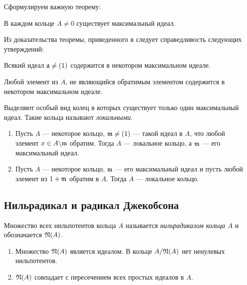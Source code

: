     Сформулируем важную теорему:
    \begin{Theorem}{\cite{A-M}}
        В каждом кольце $A \neq 0$ существует максимальный идеал.
    \end{Theorem}
    Из доказательства теоремы, приведенного в \cite{A-M} следует справедливость следующих утверждений:
    \begin{Corollary} {\cite{A-M}} 
        Всякий идеал $\mathfrak{a} \neq (1)$ содержится в некотором максимальном идеале.
    \end{Corollary}
    \begin{Corollary} \cite{A-M}
        Любой элемент из $A$, не являющийся обратимым элементом содержится в некотором максимальном идеале.
    \end{Corollary}

    Выделяют особый вид колец в которых существует только один максимальный идеал. Такие кольца называют \textit{локальными}.
    
    \begin{Theorem}{\cite{A-M}}
        \begin{enumerate}
            \item Пусть $A$ --- некоторое кольцо, $\mathfrak{m} \neq (1)$ --- такой идеал в $A$, что любой элемент $x \in A \backslash \mathfrak{m}$ обратим. 
            Тогда $A$ --- локальное кольцо, а $\mathfrak{m}$ --- его максимальный идеал.
            \item Пусть $A$ --- некоторое кольцо, $\mathfrak{m}$ --- его максимальный идеал и пусть любой элемент из $1 + \mathfrak{m}$ обратим в $A$. Тогда $A$ --- локальное кольцо.
        \end{enumerate}
    \end{Theorem}

    \subsection{Нильрадикал и радикал Джекобсона}

    \begin{Def}
        Множество всех нильпотентов кольца $A$ называется \textit{нильрадикалом кольца $A$} и обозначается $\mathfrak{N}(A)$.
    \end{Def}

    \begin{Theorem}{\cite{A-M}}
        \begin{enumerate}
            \item Множество $\mathfrak{N}(A)$ является идеалом. В кольце $A/\mathfrak{N}(A)$ нет ненулевых нильпотентов.
            \item $\mathfrak{N}(A)$ совпадает с пересечением всех простых идеалов в $A$.
        \end{enumerate}
    \end{Theorem}

